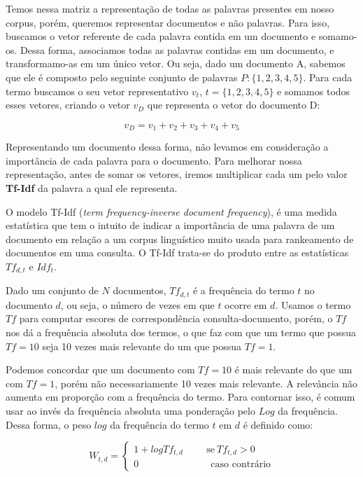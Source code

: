\documentclass[a4paper,12pt]{article}
\begin{document}
Temos nessa matriz a representação de todas as palavras presentes em nosso corpus, porém, queremos representar documentos e não palavras.
Para isso, buscamos o vetor referente de cada palavra contida em um documento e somamo-os. Dessa forma, associamos todas as palavras contidas
em um documento, e transformamo-as em um único vetor. Ou seja, dado um documento A, sabemos que ele é composto pelo seguinte conjunto de palavras
$P:\{1,2,3,4,5\}$. Para cada termo buscamos o seu vetor representativo $v_{t}$, $t =\{1,2,3,4,5\}$ e somamos todos esses vetores, criando o vetor
$v_{D}$ que representa o vetor do documento D:

$$v_{D} = v_{1}+v_{2}+v_{3}+v_{4}+v_{5} $$

Representando um documento dessa forma, não levamos em consideração a importância de cada palavra para o documento. Para melhorar nossa 
representação, antes de somar os vetores, iremos multiplicar cada um pelo valor \textbf{Tf-Idf} da palavra a qual ele representa.

O modelo Tf-Idf (\textit{term frequency-inverse document frequency}), é uma medida estatística que tem o intuito de indicar
a importância de uma palavra de um documento em relação a um corpus linguístico muito usada para rankeamento de documentos em uma consulta. O Tf-Idf trata-se do produto entre as estatísticas $Tf_{d,t}$ e
$Idf_{t}$.


  Dado um conjunto de $N$ documentos, $Tf_{d,t}$ é a frequência do termo $t$ no documento
  $d$, ou seja, o número de vezes em que $t$ ocorre em $d$. Usamos o termo $Tf$ para computar escores de correspondência consulta-documento,
  porém, o $Tf$ nos dá a frequência absoluta dos termos, o que faz com que um termo que possua $Tf=10$ seja 10 vezes mais relevante do um que possua
  $Tf=1$. 
  
  Podemos concordar que um documento com $Tf=10$ é mais relevante do que um com $Tf=1$, porém não necessariamente 10 vezes mais relevante.
  A relevância não aumenta em proporção com a frequência do termo. Para contornar isso, é comum usar ao invés da frequência absoluta uma ponderação
  pelo $Log$ da frequência. Dessa forma, o peso $log$ da frequência do termo $t$ em $d$ é definido como:
  
  $$W_{t,d}=\begin{cases}
             1 + logTf_{t,d}  \hspace{1cm} \text{se} \ Tf_{t,d} > 0 \\
             0 \ \hspace{3cm} \text{caso contrário}
            \end{cases}
 $$
 
\end{document}
